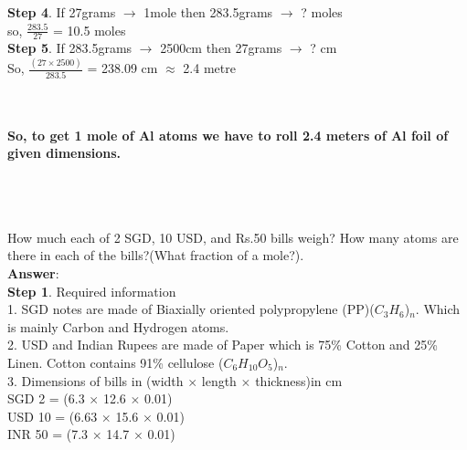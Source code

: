 \documentclass[11pt]{exam}
\begin{document}
\begin{questions}
{\begin{minipage}{28em}
 \textbf{Step 4}. If 27grams $\rightarrow$ 1mole then 283.5grams $\rightarrow$ ? moles\\
                so, $\frac{283.5}{27}$ = 10.5 moles\\ 
            
                
\textbf{Step 5}. If 283.5grams $\rightarrow$ 2500cm then 27grams $\rightarrow$ ? cm\\
                So, $\frac{(27 \times 2500)}{283.5}$ = 238.09 cm $\approx$ 2.4 metre\\
                
\end{minipage}} \\ \\ 

                  
\textbf{So, to get 1 mole of Al atoms we have to roll 2.4 meters of Al foil of given dimensions.} \\ \\ \\ \\


\question
\label{Q2:Dollar bills}

How much each of 2 SGD, 10 USD, and Rs.50 bills weigh? How many atoms are there in each of the bills?(What fraction of a mole?).\\
\textbf{Answer}: \\ 
\textbf{Step 1}. Required information\\ 

                 1. SGD notes are made of Biaxially oriented polypropylene (PP)($C_{3}H_{6}$)$_{n}$. Which is mainly Carbon and Hydrogen atoms.\\
                 
                 2. USD and Indian Rupees are made of Paper which is 75\% Cotton and 25\% Linen. Cotton contains 91\% cellulose ($C_{6}H_{10}O_{5}$)$_{n}$.\\ 
                 
                 3. Dimensions of bills in (width $\times$ length $\times$ thickness)in cm \\
                 SGD 2 = (6.3 $\times$ 12.6 $\times$ 0.01) \\
                 USD 10 = (6.63 $\times$ 15.6 $\times$ 0.01)\\
                 INR 50 = (7.3 $\times$ 14.7 $\times$ 0.01)\\   
                 

\end{questions}
\end{document}
